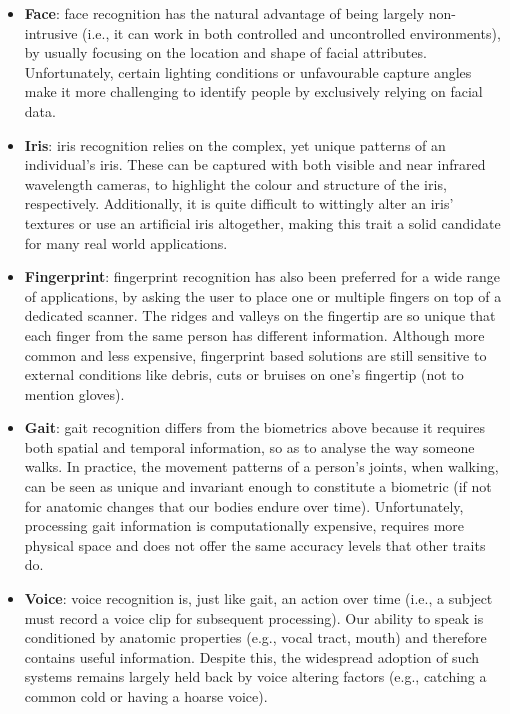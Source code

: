 \begin{itemize}
    \item \textbf{Face}: face recognition has the natural advantage of being largely non-intrusive (i.e., it can work in both controlled and uncontrolled environments), by usually focusing on the location and shape of facial attributes. Unfortunately, certain lighting conditions or unfavourable capture angles make it  more challenging to identify people by exclusively relying on facial data.
    \item \textbf{Iris}: iris recognition relies on the complex, yet unique patterns of an individual's iris. These can be captured with both visible and near infrared wavelength cameras, to highlight the colour and structure of the iris, respectively. Additionally, it is quite difficult to wittingly alter an iris' textures or use an artificial iris altogether, making this trait a solid candidate for many real world applications.
    \item \textbf{Fingerprint}: fingerprint recognition has also been preferred for a wide range of applications, by asking the user to place one or multiple fingers on top of a dedicated scanner. The ridges and valleys on the fingertip are so unique that each finger from the same person has different information. Although more common and less expensive, fingerprint based solutions are still sensitive to external conditions like debris, cuts or bruises on one's fingertip (not to mention gloves).
    \item \textbf{Gait}: gait recognition differs from the biometrics above because it requires both spatial and temporal information, so as to analyse the way someone walks. In practice, the movement patterns of a person's joints, when walking, can be seen as unique and invariant enough to constitute a biometric (if not for anatomic changes that our bodies endure over time). Unfortunately, processing gait information is computationally expensive, requires more physical space and does not offer the same accuracy levels that other traits do.
    \item \textbf{Voice}: voice recognition is, just like gait, an action over time (i.e., a subject must record a voice clip for subsequent processing). Our ability to speak is conditioned by anatomic properties (e.g., vocal tract, mouth) and therefore contains useful information. Despite this, the widespread adoption of such systems remains largely held back by voice altering factors (e.g., catching a common cold or having a hoarse voice).
\end{itemize}

